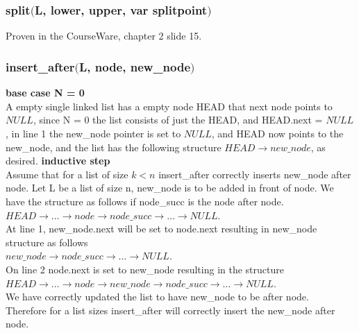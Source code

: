 \documentclass{article}
\begin{document}
        \subsubsection{split$($L, lower, upper, var splitpoint$)$}
          Proven in the CourseWare, chapter 2 slide 15.
        \subsubsection{insert\_after$($L, node, new\_node$)$}
          \textbf{base case N = 0} \\
          A empty single linked list has a empty node HEAD that next node points to $NULL$, since N = 0 the list consists of just the HEAD, and HEAD.next = $NULL$, in line 1 the new\_node pointer is set to $NULL$, and HEAD now points to the new\_node, and the list has the following structure $HEAD \rightarrow new\_node$, as desired.
          \textbf{inductive step} \\
          Assume that for a list of size $k < n$ insert\_after correctly inserts new\_node after node.
          Let L be a list of size n, new\_node is to be added in front of node. We have the structure as follows if node\_succ is the node after node.\\
          $HEAD \rightarrow \ldots \rightarrow node \rightarrow node\_succ \rightarrow \ldots \rightarrow NULL$. \\
          At line 1, new\_node.next will be set to node.next resulting in new\_node structure as follows \\
          $new\_node \rightarrow node\_succ \rightarrow \ldots \rightarrow NULL$. \\
         On line 2 node.next is set to new\_node resulting in the structure \\
         $HEAD \rightarrow \ldots \rightarrow node \rightarrow new\_node \rightarrow node\_succ \rightarrow \ldots \rightarrow NULL$. \\
         We have correctly updated the list to have new\_node to be after node.\\
         Therefore for a list sizes insert\_after will correctly insert the new\_node after node.
\end{document}
